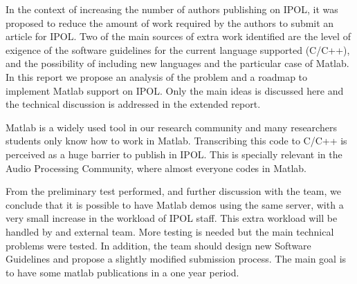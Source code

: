 
In the context of increasing the number of authors publishing on IPOL, it was proposed to reduce the amount of work required by the authors to submit an article for IPOL.
Two of the main sources of extra work identified are the level of exigence of the software guidelines for the current language supported (C/C++), and the possibility of including new languages and the particular case of Matlab.
In this report we propose an analysis of the problem and a roadmap to implement Matlab support on IPOL. Only the main ideas is discussed here and the technical discussion is addressed in the extended report.

Matlab is a widely used tool in our research community and many researchers students only know how to work in Matlab. Transcribing this code to C/C++ is perceived as a huge barrier to publish in IPOL. This is specially relevant in the Audio Processing Community, where almost everyone codes in Matlab.

From the preliminary test performed, and further discussion with the team, we conclude that it is possible to have Matlab demos using the same server, with a very small increase in the workload of IPOL staff. This extra workload will be handled by and external team. More testing is needed but the main technical problems were tested.
In addition, the team should design new Software Guidelines and propose a slightly modified submission process.
The main goal is to have some matlab publications in a one year period.

